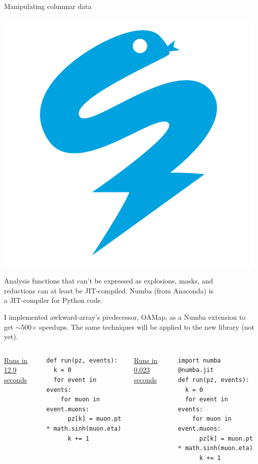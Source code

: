 \documentclass[aspectratio=169]{beamer}
\begin{document}
\begin{frame}[fragile]{Manipulating columnar data}
\vspace{0.5 cm}

\hfill \includegraphics[height=2 cm]{numba-logo.png}

\vspace{-2 cm}

Analysis functions that can't be expressed as explosions, masks, and \\
reductions can at least be JIT-compiled. Numba (from Anaconda) is \\
a JIT-compiler for Python code.

\vspace{0.5 cm}
I implemented awkward-array's predecessor, OAMap, as a Numba extension to get $\sim$500$\times$ speedups. The same techniques will be applied to the new library (not yet).

\vspace{0.5 cm}
\begin{columns}[t]
\underline{Runs in 12.9 seconds}

\scriptsize
\vspace{2\baselineskip}
\begin{verbatim}
def run(pz, events):
  k = 0
  for event in events:
    for muon in event.muons:
      pz[k] = muon.pt * math.sinh(muon.eta)
      k += 1
\end{verbatim}

\underline{Runs in 0.023 seconds}

\scriptsize
\begin{verbatim}
import numba
@numba.jit
def run(pz, events):
  k = 0
  for event in events:
    for muon in event.muons:
      pz[k] = muon.pt * math.sinh(muon.eta)
      k += 1
\end{verbatim}
\end{columns}
\end{frame}
\end{document}
